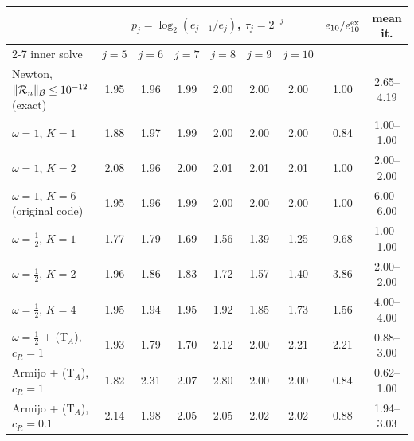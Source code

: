 \begin{tabular}{lcccccccc}
\toprule
& \multicolumn{6}{c}{$p_j=\log_2(e_{j-1}/e_j)$, $\tau_j=2^{-j}$} & $e_{10}/e^{\rm ex}_{10}$ & mean it.\\
\cmidrule(lr){2-7}
inner solve & $j=5$ & $j=6$ & $j=7$ & $j=8$ & $j=9$ & $j=10$ & & \\
\midrule
Newton, $\lVert \mathcal{R}_n\rVert_{\mathcal{B}}\le10^{-12}$ (exact) & 1.95 & 1.96 & 1.99 & 2.00 & 2.00 & 2.00 & 1.00 & 2.65--4.19\\
$\omega=1$, $K=1$ & 1.88 & 1.97 & 1.99 & 2.00 & 2.00 & 2.00 & 0.84 & 1.00--1.00\\
$\omega=1$, $K=2$ & 2.08 & 1.96 & 2.00 & 2.01 & 2.01 & 2.01 & 1.00 & 2.00--2.00\\
$\omega=1$, $K=6$ (original code) & 1.95 & 1.96 & 1.99 & 2.00 & 2.00 & 2.00 & 1.00 & 6.00--6.00\\
$\omega=\frac12$, $K=1$ & 1.77 & 1.79 & 1.69 & 1.56 & 1.39 & 1.25 & 9.68 & 1.00--1.00\\
$\omega=\frac12$, $K=2$ & 1.96 & 1.86 & 1.83 & 1.72 & 1.57 & 1.40 & 3.86 & 2.00--2.00\\
$\omega=\frac12$, $K=4$ & 1.95 & 1.94 & 1.95 & 1.92 & 1.85 & 1.73 & 1.56 & 4.00--4.00\\
$\omega=\frac12$ + (T$_A$), $c_R=1$ & 1.93 & 1.79 & 1.70 & 2.12 & 2.00 & 2.21 & 2.21 & 0.88--3.00\\
Armijo + (T$_A$), $c_R=1$ & 1.82 & 2.31 & 2.07 & 2.80 & 2.00 & 2.00 & 0.84 & 0.62--1.00\\
Armijo + (T$_A$), $c_R=0.1$ & 2.14 & 1.98 & 2.05 & 2.05 & 2.02 & 2.02 & 0.88 & 1.94--3.03\\
\bottomrule
\end{tabular}
